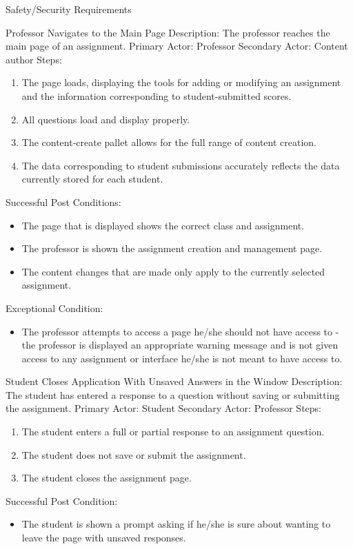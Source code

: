 \documentclass{article}
\begin{document}
\begin{section}{Safety/Security Requirements}
   \begin{subsection}{Professor Navigates to the Main Page}
   Description: The professor reaches the main page of an assignment. \newline
Primary Actor: Professor \newline
Secondary Actor: Content author \newline
Steps:
\begin{enumerate}
\item{The page loads, displaying the tools for adding or modifying an assignment and the information corresponding to student-submitted scores.}
\item{All questions load and display properly.}
\item{The content-create pallet allows for the full range of content creation.}
\item{The data corresponding to student submissions accurately reflects the data currently stored for each student.}
\end{enumerate}
Successful Post Conditions:
\begin{itemize}
\item{The page that is displayed shows the correct class and assignment.}
\item{The professor is shown the assignment creation and management page.}
\item{The content changes that are made only apply to the currently selected assignment.}
\end{itemize}
Exceptional Condition:
\begin{itemize}
\item{The professor attempts to access a page he/she should not have access to - the professor is displayed an appropriate warning message and is not given access to any assignment or interface he/she is not meant to have access to.}
\end{itemize}
\end{subsection}

\begin{subsection}{Student Closes Application With Unsaved Answers in the Window}
Description: The student has entered a response to a question without saving or submitting the assignment. \newline
Primary Actor: Student \newline
Secondary Actor: Professor \newline
Steps:
\begin{enumerate}
\item{The student enters a full or partial response to an assignment question.}
\item{The student does not save or submit the assignment.}
\item{The student closes the assignment page.}
\end{enumerate}
Successful Post Condition:
\begin{itemize}
\item{The student is shown a prompt asking if he/she is sure about wanting to leave the page with unsaved responses.}
\end{itemize}
\end{subsection}


\end{section}
\end{document}

